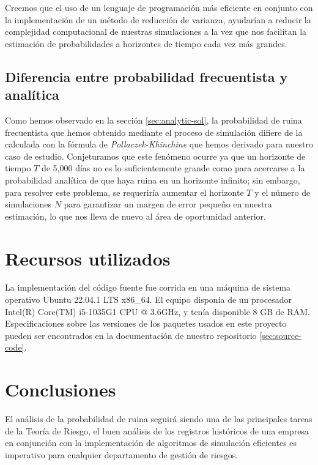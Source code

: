 \documentclass[journal]{IEEEtran}
\begin{document}
            Creemos que el uso de un lenguaje de programación más eficiente en conjunto con la implementación de un método de reducción de varianza, ayudarían a reducir la complejidad computacional de nuestras simulaciones a la vez que nos facilitan la estimación de probabilidades a horizontes de tiempo cada vez más grandes.

        \subsection{Diferencia entre probabilidad frecuentista y analítica}
            
            Como hemos observado en la sección \ref{sec:analytic-sol}, la probabilidad de ruina frecuentista que hemos obtenido mediante el proceso de simulación difiere de la calculada con la fórmula de \emph{Pollaczek-Khinchine} que hemos derivado para nuestro caso de estudio. Conjeturamos que este fenómeno ocurre ya que un horizonte de tiempo $T$ de 5,000 días no es lo suficientemente grande como para acercarse a la probabilidad analítica de que haya ruina en un horizonte infinito; sin embargo, para resolver este problema, se requeriría aumentar el horizonte $T$ y el número de simulaciones $N$ para garantizar un margen de error pequeño en nuestra estimación, lo que nos lleva de nuevo al área de oportunidad anterior.

    \section{Recursos utilizados} \label{sec:resources}

        La implementación del código fuente fue corrida en una máquina de sistema operativo Ubuntu 22.04.1 LTS x86\_64. El equipo disponía de un procesador Intel(R) Core(TM) i5-1035G1 CPU @ 3.6GHz, y tenía disponible 8 GB de RAM. Especificaciones sobre las versiones de los paquetes usados en este proyecto pueden ser encontrados en la documentación de nuestro repositorio \ref{sec:source-code}.
        
    \section{Conclusiones} \label{sec:conclusions}
        
        El análisis de la probabilidad de ruina seguirá siendo una de las principales tareas de la Teoría de Riesgo, el buen análisis de los registros históricos de una empresa en conjunción con la implementación de algoritmos de simulación eficientes es imperativo para cualquier departamento de gestión de riesgos.
\end{document}
